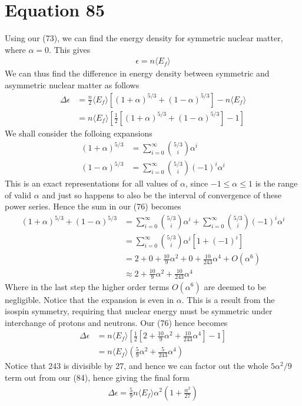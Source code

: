 \documentclass{article}
\newcommand{\la}{\langle}
\newcommand{\ra}{\rangle}
\begin{document}
\section*{Equation 85}
Using our (73), we can find the energy density for symmetric nuclear matter, where $\alpha=0$. This gives 
\begin{align}
    \epsilon=n\la E_f\ra
\end{align} 
We can thus find the difference in energy density between symmetric and asymmetric nuclear matter as follows
\begin{align}
    \Delta\epsilon&=\frac{n}{2}\la E_f\ra[(1+\alpha)^{5/3}+(1-\alpha)^{5/3}]-n\la E_f\ra\\ 
    &=n\la{E_f}\ra[\frac{1}{2}[(1+\alpha)^{5/3}+(1-\alpha)^{5/3}]-1]
\end{align}
We shall consider the folloing expansions 
\begin{align}
    (1+\alpha)^{5/3}&=\sum_{i=0}^{\infty} {5/3 \choose i}\alpha^i\\ 
    (1-\alpha)^{5/3}&=\sum_{i=0}^{\infty} {5/3 \choose i}(-1)^i\alpha^i
\end{align}
This is an exact representations for all values of $\alpha$, since $-1\leq\alpha\leq1$ is the 
range of valid $\alpha$ and just so happens to also be 
the interval of convergence of these power series. Hence the sum in our (76) becomes 
\begin{align}
    (1+\alpha)^{5/3}+(1-\alpha)^{5/3}&= \sum_{i=0}^{\infty} {5/3 \choose i}\alpha^i+\sum_{i=0}^{\infty} {5/3 \choose i}(-1)^i\alpha^i\\ 
    &=\sum_{i=0}^{\infty} {5/3 \choose i}\alpha^i [1+(-1)^i]\\ 
    &=2+0+\frac{10}{9}\alpha^2+0+\frac{10}{243}\alpha^4+O(\alpha^6)\\
    &\approx2+\frac{10}{9}\alpha^2+\frac{10}{243}\alpha^4
\end{align}
Where in the last step the higher order terms $O(\alpha^6)$ are deemed to be
 negligible. Notice that the expansion is even in $\alpha$. This is a result from the isospin symmetry, 
 requiring that nuclear energy must be symmetric under interchange of protons and neutrons.   Our (76) hence becomes 
\begin{align}
    \Delta\epsilon&=n\la{E_f}\ra[\frac{1}{2}[2+\frac{10}{9}\alpha^2+\frac{10}{243}\alpha^4]-1]\\ 
    &=n\la E_f\ra(\frac{5}{9}\alpha^2+\frac{5}{243}\alpha^4)
\end{align}
Notice that 243 is divisible by 27, and hence we can factor out the whole $5\alpha^2/9$ term out from our (84), 
hence giving the final form 
\begin{align}
    \boxed{\Delta\epsilon=\frac{5}{9}n\la{E_f}\ra\alpha^2(1+\frac{\alpha^2}{27})}
\end{align}
\end{document}
